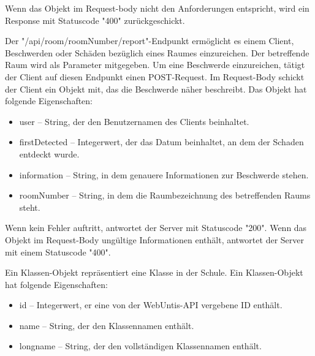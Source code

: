 Wenn das Objekt im Request-body nicht den Anforderungen entspricht, wird ein Response mit Statuscode "400" zurückgeschickt. 


Der "/api/room/{roomNumber}/report"-Endpunkt ermöglicht es einem Client, Beschwerden oder Schäden bezüglich eines Raumes einzureichen. Der betreffende Raum wird als Parameter mitgegeben. Um eine Beschwerde einzureichen, tätigt der Client auf diesen Endpunkt einen POST-Request. Im Request-Body schickt der Client ein Objekt mit, das die Beschwerde näher beschreibt. Das Objekt hat folgende Eigenschaften:

\begin{itemize}
    \item user -- String, der den Benutzernamen des Clients beinhaltet.
    \item firstDetected -- Integerwert, der das Datum beinhaltet, an dem der Schaden entdeckt wurde. 
    \item information -- String, in dem genauere Informationen zur Beschwerde stehen. 
    \item roomNumber -- String, in dem die Raumbezeichnung des betreffenden Raums steht. 
\end{itemize}

Wenn kein Fehler auftritt, antwortet der Server mit Statuscode "200". Wenn das Objekt im Request-Body ungültige Informationen enthält, antwortet der Server mit einem Statuscode "400".

\pagebreak


Ein Klassen-Objekt repräsentiert eine Klasse in der Schule. Ein Klassen-Objekt hat folgende Eigenschaften: 

\begin{itemize}
    \item id -- Integerwert, er eine von der WebUntis-API vergebene ID enthält. 
    \item name -- String, der den Klassennamen enthält. 
    \item longname -- String, der den vollständigen Klassennamen enthält. 
\end{itemize}


